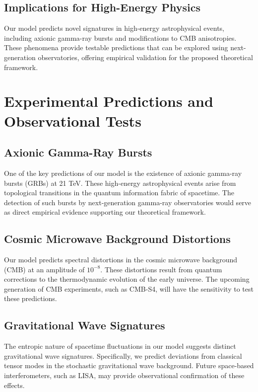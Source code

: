 \documentclass{article}
\begin{document}
\subsection{Implications for High-Energy Physics}
Our model predicts novel signatures in high-energy astrophysical events, including axionic gamma-ray bursts and modifications to CMB anisotropies. These phenomena provide testable predictions that can be explored using next-generation observatories, offering empirical validation for the proposed theoretical framework.

\section{Experimental Predictions and Observational Tests}

\subsection{Axionic Gamma-Ray Bursts}
One of the key predictions of our model is the existence of axionic gamma-ray bursts (GRBs) at 21 TeV. These high-energy astrophysical events arise from topological transitions in the quantum information fabric of spacetime. The detection of such bursts by next-generation gamma-ray observatories would serve as direct empirical evidence supporting our theoretical framework.

\subsection{Cosmic Microwave Background Distortions}
Our model predicts spectral distortions in the cosmic microwave background (CMB) at an amplitude of $10^{-8}$. These distortions result from quantum corrections to the thermodynamic evolution of the early universe. The upcoming generation of CMB experiments, such as CMB-S4, will have the sensitivity to test these predictions.

\subsection{Gravitational Wave Signatures}
The entropic nature of spacetime fluctuations in our model suggests distinct gravitational wave signatures. Specifically, we predict deviations from classical tensor modes in the stochastic gravitational wave background. Future space-based interferometers, such as LISA, may provide observational confirmation of these effects.
\end{document}
